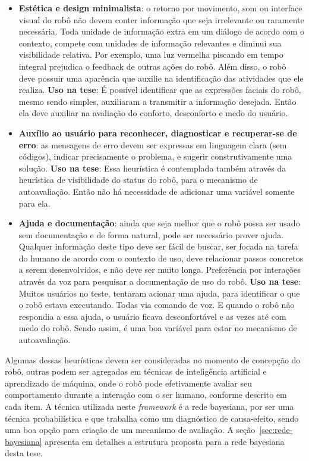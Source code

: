 \begin{itemize}
	\item \textbf{Estética e design minimalista}: o retorno por movimento, som ou interface visual do robô não devem conter informação que seja irrelevante ou raramente necessária. Toda unidade de informação extra em um diálogo de acordo com o contexto, compete com unidades de informação relevantes e diminui sua visibilidade relativa. Por exemplo, uma luz vermelha piscando em tempo integral prejudica o feedback de outras ações do robô. Além disso, o robô deve possuir uma aparência que auxilie na identificação das atividades que ele realiza. \textbf{Uso na tese}: É possível identificar que as expressões faciais do robô, mesmo sendo simples, auxiliaram a transmitir a informação desejada. Então ela deve auxiliar na avaliação do conforto, desconforto e medo do usuário.
	\item \textbf{Auxílio ao usuário para reconhecer, diagnosticar e recuperar-se de erro}: as mensagens de erro devem ser expressas em linguagem clara (sem códigos), indicar precisamente o problema, e sugerir construtivamente uma solução. \textbf{Uso na tese}: Essa heurística é contemplada também através da heurística de visibilidade do status do robô, para o mecanismo de autoavaliação. Então não há necessidade de adicionar uma variável somente para ela.
	\item \textbf{Ajuda e documentação}: ainda que seja melhor que o robô possa ser usado sem documentação e de forma natural, pode ser necessário prover ajuda. Qualquer informação deste tipo deve ser fácil de buscar, ser focada na tarefa do humano de acordo com o contexto de uso, deve relacionar passos concretos a serem desenvolvidos, e não deve ser muito longa. Preferência por interações através da voz para pesquisar a documentação de uso do robô. \textbf{Uso na tese}: Muitos usuários no teste, tentaram acionar uma ajuda, para identificar o que o robô estava executando. Todas via comando de voz. E quando o robô não respondia a essa ajuda, o usuário ficava desconfortável e as vezes até com medo do robô. Sendo assim, é uma boa variável para estar no mecanismo de autoavaliação.
\end{itemize}

Algumas dessas heurísticas devem ser consideradas no momento de concepção do robô, outras podem ser agregadas em técnicas de inteligência artificial e aprendizado de máquina, onde o robô pode efetivamente avaliar seu comportamento durante a interação com o ser humano, conforme descrito em cada item. A técnica utilizada neste \emph{framework} é a rede bayesiana, por ser uma técnica probabilística e que trabalha como um diagnóstico de causa-efeito, sendo uma boa opção para criação de um mecanismo de avaliação. A seção~\ref{sec:rede-bayesiana} apresenta em detalhes a estrutura proposta para a rede bayesiana desta tese.


